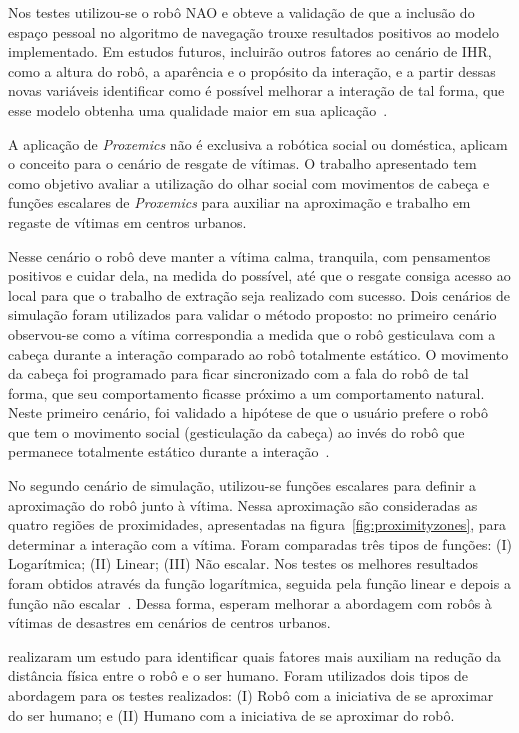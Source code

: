 Nos testes utilizou-se o robô NAO e obteve a validação de que a inclusão do espaço pessoal no algoritmo de navegação trouxe resultados positivos ao modelo implementado. Em estudos futuros,  incluirão outros fatores ao cenário de IHR, como a altura do robô, a aparência e o propósito da interação, e a partir dessas novas variáveis identificar como é possível melhorar a interação de tal forma, que esse modelo obtenha uma qualidade maior em sua aplicação~\cite{Torta:2011}.

A aplicação de \emph{Proxemics} não é exclusiva a robótica social ou doméstica,  aplicam o conceito para o cenário de resgate de vítimas. O trabalho apresentado tem como objetivo avaliar a utilização do olhar social com movimentos de cabeça e funções escalares de \emph{Proxemics} para auxiliar na aproximação e trabalho em regaste de vítimas em centros urbanos.

Nesse cenário o robô deve manter a vítima calma, tranquila, com pensamentos positivos e cuidar dela, na medida do possível, até que o resgate consiga acesso ao local para que o trabalho de extração seja realizado com sucesso. Dois cenários de simulação foram utilizados para validar o método proposto: no primeiro cenário observou-se como a vítima correspondia a medida que o robô gesticulava com a cabeça durante a interação comparado ao robô totalmente estático. O movimento da cabeça foi programado para ficar sincronizado com a fala do robô de tal forma, que seu comportamento ficasse próximo a um comportamento natural. Neste primeiro cenário, foi validado a hipótese de que o usuário prefere o robô que tem o movimento social (gesticulação da cabeça) ao invés do robô que permanece totalmente estático durante a interação~\cite{Srinivasan:2012}.

No segundo cenário de simulação, utilizou-se funções escalares para definir a aproximação do robô junto à vítima. Nessa aproximação são consideradas as quatro regiões de proximidades, apresentadas na figura~\ref{fig:proximityzones}, para determinar a interação com a vítima. Foram comparadas três tipos de funções: (I) Logarítmica; (II) Linear; (III) Não escalar. Nos testes os melhores resultados foram obtidos através da função logarítmica, seguida pela função linear e depois a função não escalar~\cite{Srinivasan:2012}. Dessa forma,  esperam melhorar a abordagem com robôs à vítimas de desastres em cenários de centros urbanos.

 realizaram um estudo para identificar quais fatores mais auxiliam na redução da distância física entre o robô e o ser humano. Foram utilizados dois tipos de abordagem para os testes realizados: (I) Robô com a iniciativa de se aproximar do ser humano; e (II) Humano com a iniciativa de se aproximar do robô.

